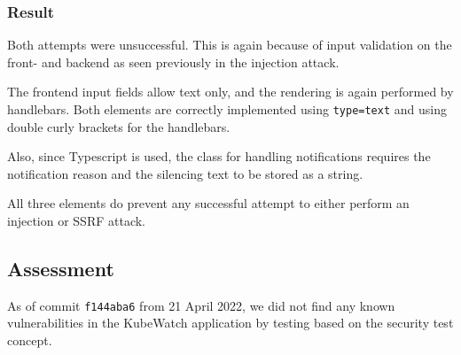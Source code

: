 \subsubsection{Result}
Both attempts were unsuccessful. This is again because of input validation on the front- and backend as seen previously in the injection attack.

The frontend input fields allow text only, and the rendering is again performed by handlebars. Both elements are correctly implemented using \lstinline "type=text" and using double curly brackets for the handlebars.

Also, since Typescript is used, the class for handling notifications requires the notification reason and the silencing text to be stored as a string.

All three elements do prevent any successful attempt to either perform an injection or SSRF attack.


\subsection{Assessment}
As of commit \lstinline "f144aba6" from 21 April 2022, we did not find any known vulnerabilities in the KubeWatch application by testing based on the security test concept.
